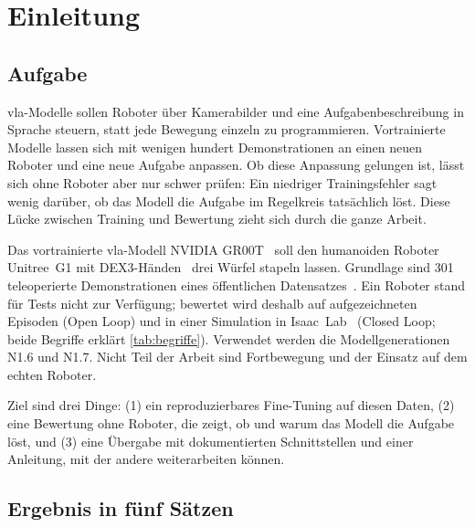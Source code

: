 
\chapter{Einleitung}
\label{chap:einleitung}

\section{Aufgabe}
\label{sec:aufgabe}
\label{sec:motivation}
\label{sec:problemstellung}
\label{sec:zielsetzung}

\ac{vla}-Modelle sollen Roboter über Kamerabilder und eine Aufgabenbeschreibung in Sprache
steuern, statt jede Bewegung einzeln zu programmieren. Vortrainierte Modelle lassen sich mit
wenigen hundert Demonstrationen an einen neuen Roboter und eine neue Aufgabe anpassen. Ob diese
Anpassung gelungen ist, lässt sich ohne Roboter aber nur schwer prüfen: Ein niedriger
Trainingsfehler sagt wenig darüber, ob das Modell die Aufgabe im Regelkreis tatsächlich löst.
Diese Lücke zwischen Training und Bewertung zieht sich durch die ganze Arbeit.

Das vortrainierte \ac{vla}-Modell NVIDIA GR00T~\cite{groot2025} soll den humanoiden
Roboter Unitree~G1 mit DEX3-Händen~\cite{unitree_g1} drei Würfel stapeln lassen. Grundlage
sind 301 teleoperierte Demonstrationen eines öffentlichen
Datensatzes~\cite{g1dex3dataset}. Ein Roboter stand für Tests nicht zur Verfügung; bewertet
wird deshalb auf aufgezeichneten Episoden (Open Loop) und in einer Simulation in
Isaac~Lab~\cite{isaaclab2023} (Closed Loop; beide Begriffe erklärt \cref{tab:begriffe}). Verwendet werden die Modellgenerationen N1.6 und
N1.7. Nicht Teil der Arbeit sind Fortbewegung und der Einsatz auf dem echten Roboter.

Ziel sind drei Dinge: (1) ein reproduzierbares Fine-Tuning auf diesen Daten, (2) eine
Bewertung ohne Roboter, die zeigt, ob und warum das Modell die Aufgabe löst, und (3) eine
Übergabe mit dokumentierten Schnittstellen und einer Anleitung, mit der andere weiterarbeiten
können.

\section{Ergebnis in fünf Sätzen}
\label{sec:ergebnis-kurz}

